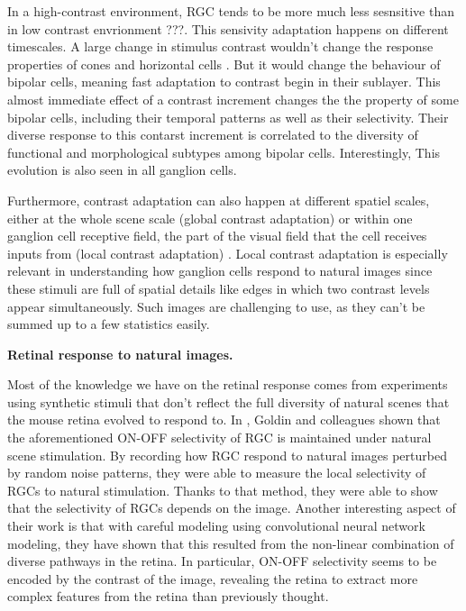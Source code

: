 In a high-contrast environment, RGC tends to be more much less sesnsitive than
in low contrast envrionment \cite{} ???.
This sensivity adaptation happens on different timescales.
A large change in stimulus contrast wouldn't change the response properties of
cones and horizontal cells \citep{baccus_fast_2002}. But it would change the
behaviour of
bipolar cells, meaning fast adaptation to contrast begin in their sublayer.
This almost immediate effect of a contrast increment changes the the property
of some bipolar cells, including their temporal patterns as well as their
selectivity. Their diverse response to this contarst increment
is correlated to the diversity of functional and morphological subtypes among
bipolar cells.
Interestingly, This evolution is also seen in all ganglion cells.



Furthermore, contrast adaptation can also
happen at different spatiel scales, either at the whole scene scale (global
contrast
adaptation) or within one ganglion cell receptive field, the part of the visual
field that the cell receives inputs from (local contrast adaptation)
\citep{garvert_local_2013}. Local contrast adaptation is especially relevant in
understanding how ganglion cells respond to natural images since these stimuli
are full of spatial details like edges in which two contrast levels appear
simultaneously. Such images are challenging to use, as they can't be summed up
to a few statistics easily.


\textbf{Retinal response to natural images.}

Most of the knowledge we have on the retinal response comes from experiments
using synthetic stimuli that don't reflect the full diversity of natural
scenes that the mouse retina evolved to respond to. In
\cite{goldin_context-dependent_2022}, Goldin and colleagues shown that the
aforementioned ON-OFF selectivity of RGC is maintained under natural scene
stimulation. By recording how RGC respond to natural images perturbed by
random noise patterns, they were able to measure the local selectivity of RGCs
to natural stimulation.
Thanks to that method, they were able to show that the selectivity of RGCs
depends on the image. Another interesting aspect of their work is that with
careful modeling using convolutional neural network modeling, they have shown
that this resulted from the non-linear combination of diverse pathways in the
retina. In particular, ON-OFF selectivity seems to be encoded by the contrast
of the image, revealing the retina to extract more complex features from the
retina than previously thought.

